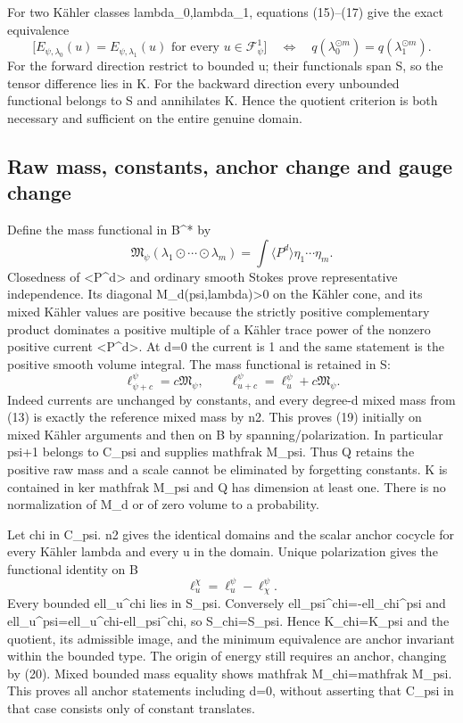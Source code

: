 \documentclass[
]{article}
\begin{document}
For two Kähler classes lambda\_0,lambda\_1, equations (15)--(17) give
the exact equivalence \[
\big[E_{\psi,\lambda_0}(u)=E_{\psi,\lambda_1}(u)
\text{ for every }u\in\mathcal F^1_\psi\big]
\quad\Longleftrightarrow\quad
q(\lambda_0^{\odot m})=q(\lambda_1^{\odot m}).\tag{18}
\] For the forward direction restrict to bounded u; their functionals
span S, so the tensor difference lies in K. For the backward direction
every unbounded functional belongs to S and annihilates K. Hence the
quotient criterion is both necessary and sufficient on the entire
genuine domain.

\subsection{Raw mass, constants, anchor change and gauge
change}\label{raw-mass-constants-anchor-change-and-gauge-change}

Define the mass functional in B\^{}* by \[
\mathfrak M_\psi(\lambda_1\odot\cdots\odot\lambda_m)
=\int\langle P^d\rangle\eta_1\cdots\eta_m.
\] Closedness of \textless P\^{}d\textgreater{} and ordinary smooth
Stokes prove representative independence. Its diagonal
M\_d(psi,lambda)\textgreater0 on the Kähler cone, and its mixed Kähler
values are positive because the strictly positive complementary product
dominates a positive multiple of a Kähler trace power of the nonzero
positive current \textless P\^{}d\textgreater. At d=0 the current is 1
and the same statement is the positive smooth volume integral. The mass
functional is retained in S: \[
\ell_{\psi+c}^\psi=c\mathfrak M_\psi,\qquad
\ell_{u+c}^\psi=\ell_u^\psi+c\mathfrak M_\psi.\tag{19}
\] Indeed currents are unchanged by constants, and every degree-d mixed
mass from (13) is exactly the reference mixed mass by n2. This proves
(19) initially on mixed Kähler arguments and then on B by
spanning/polarization. In particular psi+1 belongs to C\_psi and
supplies mathfrak M\_psi. Thus Q retains the positive raw mass and a
scale cannot be eliminated by forgetting constants. K is contained in
ker mathfrak M\_psi and Q has dimension at least one. There is no
normalization of M\_d or of zero volume to a probability.

Let chi in C\_psi. n2 gives the identical domains and the scalar anchor
cocycle for every Kähler lambda and every u in the domain. Unique
polarization gives the functional identity on B \[
\ell_u^\chi=\ell_u^\psi-\ell_\chi^\psi.\tag{20}
\] Every bounded ell\_u\^{}chi lies in S\_psi. Conversely
ell\_psi\^{}chi=-ell\_chi\^{}psi and
ell\_u\^{}psi=ell\_u\^{}chi-ell\_psi\^{}chi, so S\_chi=S\_psi. Hence
K\_chi=K\_psi and the quotient, its admissible image, and the minimum
equivalence are anchor invariant within the bounded type. The origin of
energy still requires an anchor, changing by (20). Mixed bounded mass
equality shows mathfrak M\_chi=mathfrak M\_psi. This proves all anchor
statements including d=0, without asserting that C\_psi in that case
consists only of constant translates.
\end{document}
